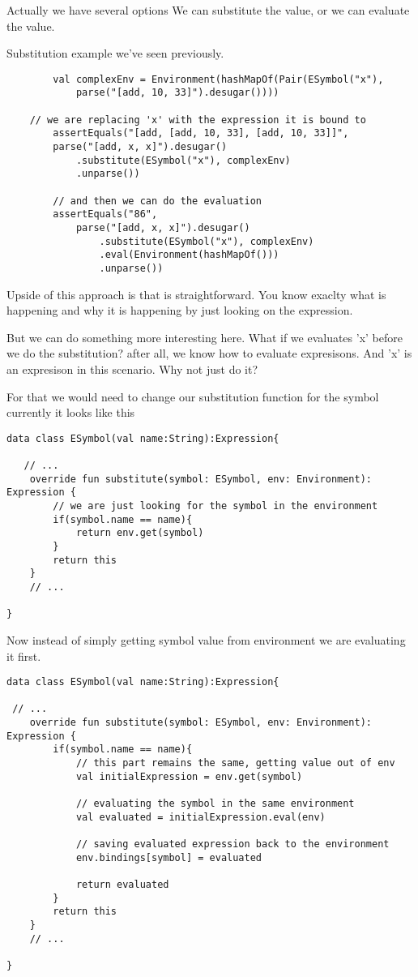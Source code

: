 \documentclass[11pt]{article}
\begin{document}
Actually we have several options
We can substitute the value, or we can evaluate the value.

Substitution example we've seen previously.
\begin{verbatim}
        val complexEnv = Environment(hashMapOf(Pair(ESymbol("x"),
            parse("[add, 10, 33]").desugar())))

    // we are replacing 'x' with the expression it is bound to
        assertEquals("[add, [add, 10, 33], [add, 10, 33]]",
        parse("[add, x, x]").desugar()
            .substitute(ESymbol("x"), complexEnv)
            .unparse())

        // and then we can do the evaluation
        assertEquals("86",
            parse("[add, x, x]").desugar()
                .substitute(ESymbol("x"), complexEnv)
                .eval(Environment(hashMapOf()))
                .unparse())
\end{verbatim}

Upside of this approach is that is straightforward. You know exaclty what is happening and why it is happening by just looking on the expression.

But we can do something more interesting here.
What if we evaluates 'x' before we do the substitution?
after all, we know how to evaluate expresisons. And 'x' is an expresison in this scenario.
Why not just do it?

For that we would need to change our substitution function for the symbol
currently it looks like this
\begin{verbatim}
data class ESymbol(val name:String):Expression{

   // ...
    override fun substitute(symbol: ESymbol, env: Environment): Expression {
        // we are just looking for the symbol in the environment
        if(symbol.name == name){
            return env.get(symbol)
        }
        return this
    }
    // ...

}

\end{verbatim}

Now instead of simply getting symbol value from environment we are evaluating it first.

\begin{verbatim}
data class ESymbol(val name:String):Expression{

 // ...
    override fun substitute(symbol: ESymbol, env: Environment): Expression {
        if(symbol.name == name){
            // this part remains the same, getting value out of env
            val initialExpression = env.get(symbol)

            // evaluating the symbol in the same environment
            val evaluated = initialExpression.eval(env)

            // saving evaluated expression back to the environment
            env.bindings[symbol] = evaluated

            return evaluated
        }
        return this
    }
    // ...

}
\end{verbatim}
\end{document}
